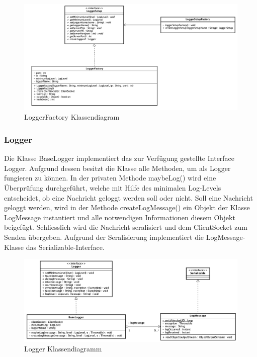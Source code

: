 \begin{figure}[H]
	\centering
	\includegraphics[width=\textwidth]{2_Architektur/Bilder/loggerFactory.png}
	\caption{LoggerFactory Klassendiagram}
	\label{fig:LoggerFactory Klassendiagramm}
\end{figure}

\newpage
\subsubsection{Logger}
Die Klasse BaseLogger implementiert das zur Verfügung gestellte Interface Logger. Aufgrund dessen besitzt die Klasse alle Methoden, um als Logger fungieren zu können. In der privaten Methode maybeLog() wird eine Überprüfung durchgeführt, welche mit Hilfe des minimalen Log-Levels entscheidet, ob eine Nachricht geloggt werden soll oder nicht. Soll eine Nachricht geloggt werden, wird in der Methode createLogMessage() ein Objekt der Klasse LogMessage instantiert und alle notwendigen Informationen diesem Objekt beigefügt. Schliesslich wird die Nachricht seralisiert und dem ClientSocket zum Senden übergeben. Aufgrund der Seralisierung implementiert die LogMessage-Klasse das Serializable-Interface.

\begin{figure}[H]
	\centering
	\includegraphics[width=\textwidth]{2_Architektur/Bilder/loggerClasses.png}
	\caption{Logger Klassendiagramm}
	\label{fig:Logger Klassendiagramm}
\end{figure}

